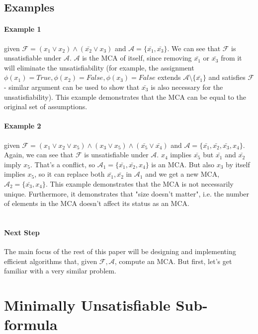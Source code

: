 \documentclass[]{article}
\begin{document}
	\subsection{Examples}
	\paragraph{Example 1 } given  $\mathcal{F} = (x_1 \lor x_2) \land (\bar{x_2} \lor x_3)$ and $\mathcal{A} =\{\bar{x_1}, \bar{x_3}\}$. We can see that $ \mathcal{F} $ is unsatisfiable under $ \mathcal{A} $. $ \mathcal{A} $ is the MCA of itself, since removing $\bar{x_1}$ or $\bar{x_3}$ from it will eliminate the unsatisfiability (for example, the assignment $ \phi(x_1)=True,\phi(x_2)=False, \phi(x_3)=False $ extends $ \mathcal{A} \setminus \{\bar{x_1}\} $ and satisfies $\mathcal{F}$ - similar argument can be used to show that $\bar{x_3}$ is also necessary for the unsatisfiability). This example demonstrates that the MCA can be equal to the original set of assumptions.
	\paragraph{Example 2 } given  $\mathcal{F} = (x_1 \lor x_2 \lor x_5) \land (x_3 \lor x_5) \land (\bar{x_5} \lor \bar{x_4})$ and $\mathcal{A} =\{\bar{x_1}, \bar{x_2}, \bar{x_3}, x_4\}$. Again, we can see that $ \mathcal{F} $ is unsatisfiable under $ \mathcal{A} $. $ x_4 $ implies $ \bar{x_5} $ but $\bar{x_1}$ and $ \bar{x_2}$ imply $ x_5 $. That's a conflict, so $\mathcal{A}_1 =\{\bar{x_1}, \bar{x_2}, x_4\}$ is an MCA. But also $ x_3 $ by itself implies $ x_5 $, so it can replace both $ \bar{x_1}, \bar{x_2} $ in $ \mathcal{A}_1 $ and we get a new MCA, $\mathcal{A}_2 =\{\bar{x_3}, x_4\}$. 
	This example demonstrates that the MCA is not necessarily unique. Furthermore, it demonstrates that "size doesn't matter", i.e. the number of elements in the MCA doesn't affect its status as an MCA.
	\\\\
	\paragraph{Next Step} The main focus of the rest of this paper will be designing and implementing efficient algorithms that, given $\mathcal{F}, \mathcal{A}$, compute an MCA. But first, let's get familiar with a very similar problem.
	\pagebreak
	\section{Minimally Unsatisfiable Sub-formula}
\end{document}
